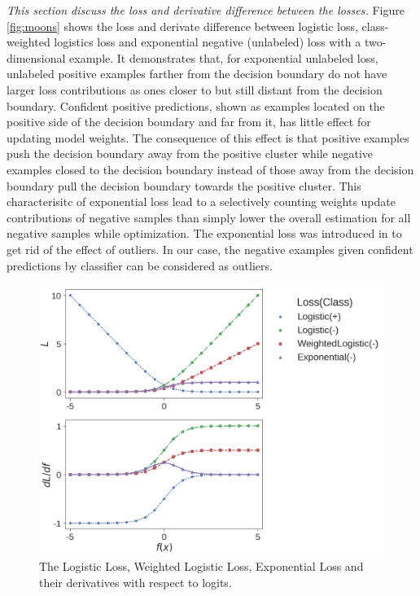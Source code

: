 \noindent \textit{This section discuss the loss and derivative difference between the losses.}
\noindent
Figure \ref{fig:moons} shows the loss and derivate difference between logistic loss, class-weighted logistics loss and exponential negative (unlabeled) loss with a two-dimensional example.
It demonstrates that, for exponential unlabeled loss, unlabeled positive examples farther from the decision boundary do not have larger loss contributions as ones closer to but still distant from the decision boundary.
Confident positive predictions, shown as examples located on the positive side of the decision boundary and far from it, has little effect for updating model weights.
The consequence of this effect is that positive examples push the decision boundary away from the positive cluster while negative examples closed to the decision boundary instead of those away from the decision boundary pull the decision boundary towards the positive cluster.
This characterisitc of exponential loss lead to a selectively counting weights update contributions of negative samples than simply lower the overall estimation for all negative samples while optimization.
The exponential loss was introduced in \cite{tax2016class} to get rid of the effect of outliers.
In our case, the negative examples given confident predictions by classifier can be considered as outliers.

\begin{figure}[t]
\centering
   \includegraphics[width=1.05\linewidth]{img/losses}
\caption{The Logistic Loss, Weighted Logistic Loss, Exponential Loss and their derivatives with respect to logits.}
\label{fig:losses}
\end{figure}

